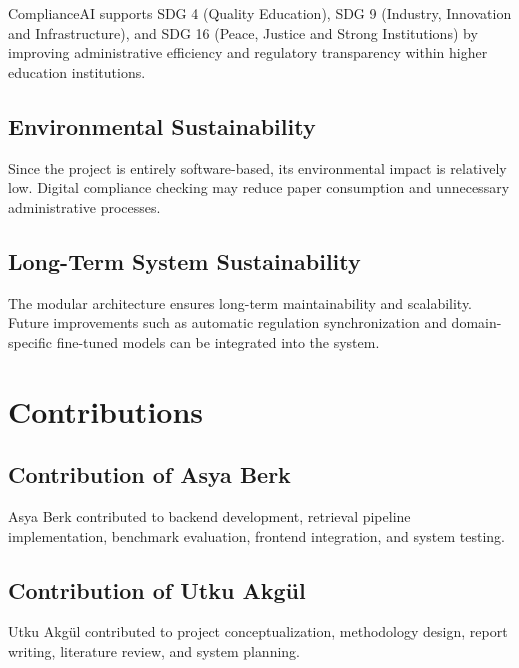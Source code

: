 \documentclass[a4paper,12pt]{article}
\begin{document}
\hspace{0.5cm} ComplianceAI supports SDG 4 (Quality Education), SDG 9 (Industry, Innovation and Infrastructure), and SDG 16 (Peace, Justice and Strong Institutions) by improving administrative efficiency and regulatory transparency within higher education institutions.

\subsection{Environmental Sustainability}

\hspace{0.5cm} Since the project is entirely software-based, its environmental impact is relatively low. Digital compliance checking may reduce paper consumption and unnecessary administrative processes.

\subsection{Long-Term System Sustainability}

\hspace{0.5cm} The modular architecture ensures long-term maintainability and scalability. Future improvements such as automatic regulation synchronization and domain-specific fine-tuned models can be integrated into the system.


\section{Contributions}

\subsection{Contribution of Asya Berk}

\hspace{0.5cm} Asya Berk contributed to backend development, retrieval pipeline implementation, benchmark evaluation, frontend integration, and system testing.

\subsection{Contribution of Utku Akgül}

\hspace{0.5cm} Utku Akgül contributed to project conceptualization, methodology design, report writing, literature review, and system planning.
\end{document}
